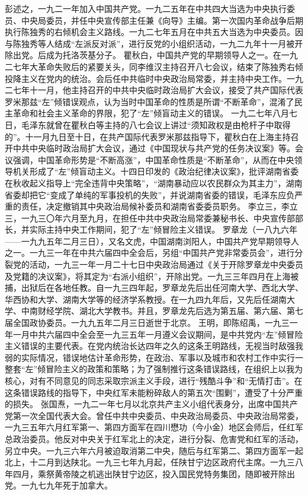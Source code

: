 \begin{maonote}
彭述之，一九二一年加入中国共产党。一九二五年在中共四大当选为中央执行委员、中央局委员，并任中央宣传部主任兼《向导》主编。第一次国内革命战争后期执行陈独秀的右倾机会主义路线。一九二七年五月在中共五大当选为中央委员。因与陈独秀等人结成“左派反对派”，进行反党的小组织活动，一九二九年十一月被开除出党。后成为托洛茨基分子。
瞿秋白，中国共产党的早期领导人之一。在一九二七年大革命失败后的紧要关头，同李维汉主持召开八七会议，结束了陈独秀右倾投降主义在党内的统治。会后任中共临时中央政治局常委，并主持中央工作。一九二七年十一月，他主持召开的中共中央临时政治局扩大会议，接受了共产国际代表罗米那兹“左”倾错误观点，认为当时中国革命的性质是所谓“不断革命”，混淆了民主革命和社会主义革命的界限，犯了“左”倾盲动主义的错误。
一九二七年八月七日，毛泽东就曾在瞿秋白等主持的八七会议上讲过“须知政权是由枪杆子中取得的”。十一月九日至十日，在共产国际代表罗米那兹指导下，瞿秋白在上海主持召开中共中央临时政治局扩大会议，通过《中国现状与共产党的任务决议案》等。会议强调，中国革命形势是“不断高涨”，中国革命性质是“不断革命”，从而在中央领导机关形成了“左”倾盲动主义。十四日印发的《政治纪律决议案》，批评湖南省委在秋收起义指导上“完全违背中央策略”，“湖南暴动应以农民群众为其主力”，湖南省委却把它“变成了单纯的军事投机的失败”，并说湖南省委的错误，毛泽东应负严重的责任，决定撤销其中央政治局候补委员和湖南省委委员职务。
李立三，李立三，一九三〇年六月至九月，在担任中共中央政治局常委兼秘书长、中央宣传部部长，并实际主持中央工作期间，犯了“左”倾冒险主义错误。
罗章龙（一八九六年——一九九五年二月三日），又名文虎，中国湖南浏阳人，中国共产党早期领导人之一。一九三一年在中共六届四中全会后，另组“中国共产党非常委员会”，进行分裂党的活动，一九三一年一月二十七日中央政治局通过《关于开除罗章龙中央委员及党籍的决议案》，将其定为“右派小组织”，开除出党。一九三三年四月在上海被捕，出狱后在各地任教。自一九三四年起，罗章龙先后出任河南大学、西北大学、华西协和大学、湖南大学等的经济学系教授。在一九四九年后，又先后任湖南大学、中南财经学院、湖北大学教书。并且，罗章龙先后选为第五届、第六届、第七届全国政协委员。一九九五年二月三日逝世于北京。
王明，即陈绍禹，一九三一年一月中共六届四中全会至一九三五年一月遵义会议期间，是中共党内“左”倾冒险主义错误的主要代表。在党内统治长达四年之久的这条王明路线，无视当时敌强我弱的实际情况，错误地估计革命形势，在政治、军事以及城市和农村工作中实行一整套“左”倾冒险主义的政策和策略；为了强制推行这条错误路线，在组织上以我为核心，对有不同意见的同志采取宗派主义手段，进行“残酷斗争”和“无情打击”。在这条错误路线的指导下，中央红军未能粉碎敌人的第五次“围剿”，遭受了十分严重的损失。
张国焘，一九二一年七月以北京共产主义小组代表身分，出席中国共产党第一次全国代表大会。曾任中共中央委员、中央政治局委员、中央政治局常委，一九三五年六月红军第一、第四方面军在四川懋功（今小金）地区会师后，任红军总政治委员。他反对中央关于红军北上的决定，进行分裂、危害党和红军的活动，另立中央。一九三六年六月被迫取消第二中央，随后与红军第二、第四方面军一起北上，十二月到达陕北。一九三七年九月起，任陕甘宁边区政府代主席。一九三八年四月，乘祭黄帝陵之机逃出陕甘宁边区，投入国民党特务集团，随即被开除出党。一九七九年死于加拿大。

\end{maonote}
